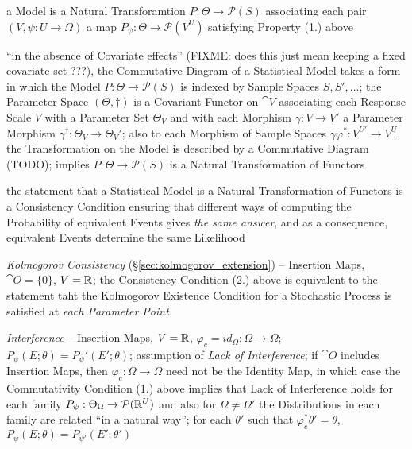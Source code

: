 a Model is a Natural Transforamtion $P : \Theta \to \mathcal{P}(S)$ associating
each pair $(V, \psi : U \to \Omega)$ a map
$P_\psi : \Theta \to \mathcal{P}(V^U)$ satisfying Property (1.) above

``in the absence of Covariate effects'' (FIXME: does this just mean keeping a
fixed covariate set ???), the Commutative Diagram of a Statistical Model takes
a form in which the Model $P : \Theta \to \mathcal{P}(S)$ is indexed by Sample
Spaces $S, S', \ldots$; the Parameter Space $(\Theta, \dagger)$ is a Covariant
Functor on $\cat{V}$ associating each Response Scale $V$ with a Parameter Set
$\Theta_V$ and with each Morphism $\gamma : V \to V'$ a Parameter Morphism
$\gamma^\dagger : \Theta_V \to \Theta_V'$; also to each Morphism of Sample
Spaces $\gamma \varphi^* : V^{U'}\to V^{U}$, the Transformation on the Model is
described by a Commutative Diagram (TODO); implies
$P : \Theta \to \mathcal{P}(S)$ is a Natural Transformation of Functors

the statement that a Statistical Model is a Natural Transformation of Functors
is a Consistency Condition ensuring that different ways of computing the
Probability of equivalent Events gives \emph{the same answer}, and as a
consequence, equivalent Events determine the same Likelihood

\emph{Kolmogorov Consistency} (\S\ref{sec:kolmogorov_extension}) -- Insertion
Maps, $\cat{O} = \{ 0 \}$, $V = \mathbb{R}$; the Consistency Condition (2.) above
is equivalent to the statement taht the Kolmogorov Existence Condition for a
Stochastic Process is satisfied at \emph{each Parameter Point}

\emph{Interference} -- Insertion Maps, $V = \mathbb{R}$,
$\varphi_c = id_\Omega : \Omega \to \Omega$;
$P_\psi(E; \theta) = P_\psi'(E'; \theta)$;
assumption of \emph{Lack of Interference}; if $\cat{O}$ includes Insertion Maps,
then $\varphi_c : \Omega \to \Omega$ need not be the Identity Map, in which case
the Commutativity Condition (1.) above implies that Lack of Interference holds
for each family $P_\psi : \Theta_\Omega \to \mathcal{P}(\mathbb{R}^U)$ and also for
$\Omega \neq \Omega'$ the Distributions in each family are related ``in a
natural way''; for each $\theta'$ such that $\varphi_c^* \theta' = \theta$,
$P_\psi(E; \theta) = P_{\psi'}(E'; \theta')$


